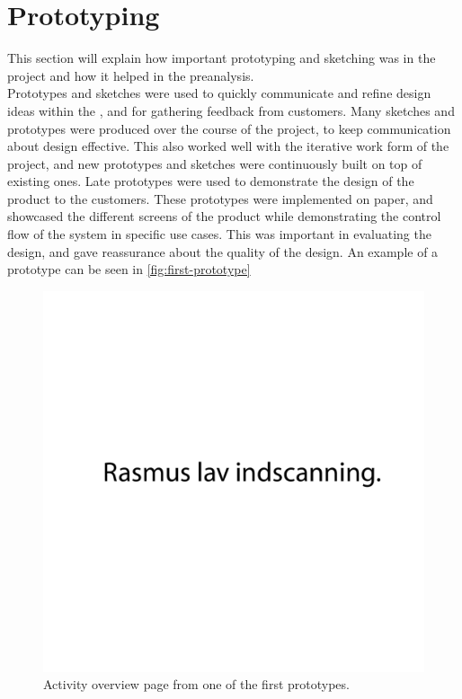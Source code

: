\section{Prototyping}
This section will explain how important prototyping and sketching was in the project and how it helped in the preanalysis. \\

Prototypes and sketches were used to quickly communicate and refine design ideas within the \localgroup{}, and for gathering feedback from customers. 
Many sketches and prototypes were produced over the course of the project, to keep communication about design effective. 
This also worked well with the iterative work form of the project, and new prototypes and sketches were continuously built on top of existing ones. \newline
Late prototypes were used to demonstrate the design of the product to the customers. 
These prototypes were implemented on paper, and showcased the different screens of the product while demonstrating the control flow of the system in specific use cases. 
This was important in evaluating the design, and gave reassurance about the quality of the design. \newline
An example of a prototype can be seen in \autoref{fig:first-prototype}

\begin{figure}[h!]
	\centering
	\includegraphics[scale=0.5]{gfx/first-prototype.pdf}
	\caption{Activity overview page from one of the first prototypes.}
	\label{fig:first-prototype}
\end{figure}
